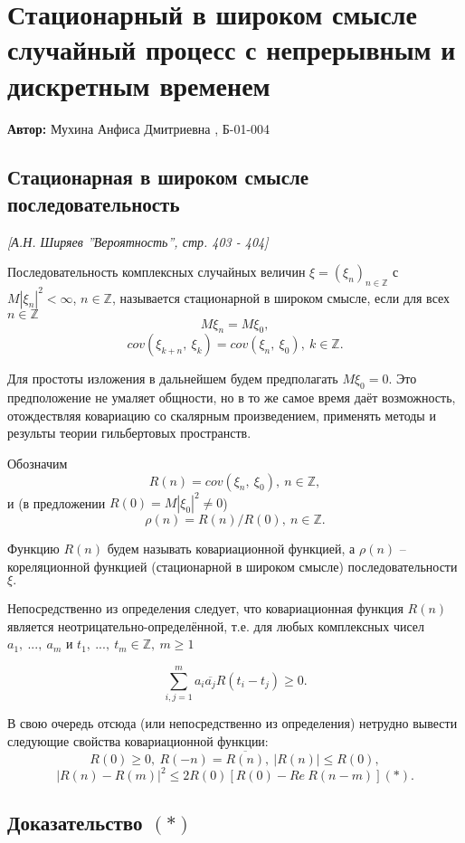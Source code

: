 
\section{Стационарный в широком смысле случайный процесс с непрерывным и дискретным временем}

 \textbf{Автор:} Мухина Анфиса Дмитриевна , Б-01-004

\subsection{Стационарная в широком смысле последовательность}

\emph{[А.Н. Ширяев ''Вероятность'', стр. 403 - 404]}

Последовательность комплексных случайных величин $\xi = (\xi_{n})_{n \in \mathbb {Z}}$ с $M|\xi_{n}|^2 < \infty$, $n \in \mathbb {Z}$, называется стационарной в широком смысле, если для всех $n \in \mathbb {Z}$ $$M\xi_{n} = M\xi_{0},$$
$$cov(\xi_{k+n}, \ \xi_{k}) = cov(\xi_{n}, \ \xi_{0}), \ k \in \mathbb {Z}.$$

Для простоты изложения в дальнейшем будем предполагать $M\xi_0 = 0$. Это предположение не умаляет общности, но в то же самое время даёт возможность, отождествляя ковариацию со скалярным произведением, применять методы и результы теории гильбертовых пространств.

Обозначим $$R(n) = cov(\xi_{n}, \ \xi_{0}), \ n \in \mathbb {Z},$$ и (в предложении $R(0) = M|\xi_{0}|^2 \neq 0$) $$\rho(n) = R(n)/R(0), \ n \in \mathbb {Z}.$$

Функцию $R(n)$ будем называть ковариационной функцией, а $\rho(n)$ -- кореляционной функцией (стационарной в широком смысле) последовательности $\xi.$

Непосредственно из определения следует, что ковариационная функция $R(n)$ является неотрицательно-определённой, т.е. для любых комплексных чисел $a_{1}, \ ..., \ a_{m}$ и $t_{1}, \ ..., \ t_{m} \in \mathbb {Z}, \ m \geq 1$ 

$$\sum_{i,j=1}^m a_i \overline{a_j}R(t_i - t_j) \geq 0.$$

В свою очередь отсюда (или непосредственно из определения) нетрудно вывести следующие свойства ковариационной функции:
$$R(0) \geq 0, \ R(-n) = \overline{R(n)}, \ |R(n)| \leq R(0),$$
$$|R(n)-R(m)|^2 \leq 2R(0)[R(0) - Re \ R(n-m)](*).$$

\subsection{Доказательство $(*)$}

